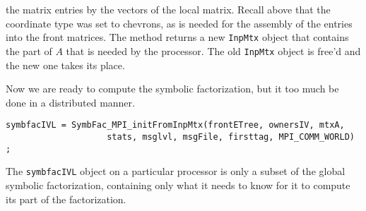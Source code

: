 the matrix entries by the vectors of the local matrix.
Recall above that the coordinate type was set to chevrons, as is
needed for the assembly of the entries into the front matrices.
The method returns a new {\tt InpMtx} object that contains the part
of $A$ that is needed by the processor.
The old {\tt InpMtx} object is free'd and the new one takes its place.
\par
Now we are ready to compute the symbolic factorization, but it too
much be done in a distributed manner.
\begin{verbatim}
symbfacIVL = SymbFac_MPI_initFromInpMtx(frontETree, ownersIV, mtxA,
                    stats, msglvl, msgFile, firsttag, MPI_COMM_WORLD) ;
\end{verbatim}
The {\tt symbfacIVL} object on a particular processor is only a
subset of the global symbolic factorization, containing only what
it needs to know for it to compute its part of the factorization.
\par
